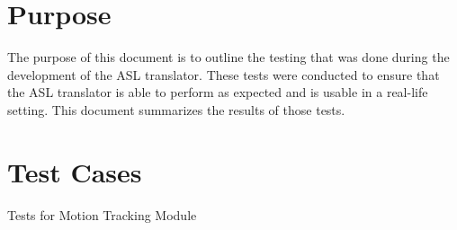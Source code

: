 \documentclass[12pt, titlepage]{article}
\begin{document}
\listoffigures %

\newpage


\section{Purpose}
The purpose of this document is to outline the testing that was done during the development 
of the ASL translator. These tests were conducted to ensure that the ASL translator is able 
to perform as expected and is usable in a real-life setting. This document summarizes the 
results of those tests.

\newpage
\section{Test Cases}
\centerline{Tests for Motion Tracking Module}
\end{document}
